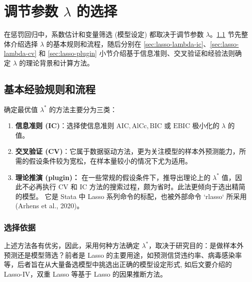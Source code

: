


\section{调节参数 $\lambda$ 的选择}\label{sec:lasso-lambda}

在惩罚回归中，系数估计和变量筛选 (模型设定) 都取决于调节参数 $\lambda$。\ref{sec:lasso-lambda-intro} 节先整体介绍选择 $\lambda$ 的基本规则和流程，随后分别在 \ref{sec:lasso-lambda-ic}、\ref{sec:lasso-lambda-cv} 和 \ref{sec:lasso-plugin} 小节介绍基于信息准则、交叉验证和经验法则确定 $\lambda$ 的理论背景和计算方法。 

\subsection{基本经验规则和流程}\label{sec:lasso-lambda-intro}

确定最优值 $\lambda^*$ 的方法主要分为三类：
\begin{enumerate}
\item \textbf{信息准则 (IC)}：选择使信息准则 $\mathrm{AIC}, \mathrm{AlCc}, \mathrm{BIC}$ 或 $\mathrm{EBIC}$ 极小化的 $\lambda$ 的值。%
\item \textbf{交叉验证 (CV)}：它属于数据驱动方法，更为关注模型的样本外预测能力，所需的假设条件较为宽松，在样本量较小的情况下尤为适用。%
\item \textbf{理论推演 (plugin)：} 在一些常规的假设条件下，推导出理论上的 $\lambda^*$ 值，因此不必再执行 CV 和 IC 方法的搜索过程，颇为省时。此法更倾向于选出精简的模型。
它是 Stata 中 Lasso 系列命令的标配，也被外部命令 `rlasso` 所采用 (Arhens et al., 2020)。
\end{enumerate}

\subsubsection{选择依据}
上述方法各有优劣，因此，采用何种方法确定 $\lambda^*$，取决于研究目的：是做样本外预测还是模型筛选？前者是 Lasso 的主要用途，如预测信贷违约率、病毒感染率等，后者旨在从大量备选模型中挑选出正确的模型设定形式, 如后文要介绍的 Lasso-IV，双重 Lasso 等基于 Lasso 的因果推断方法。

